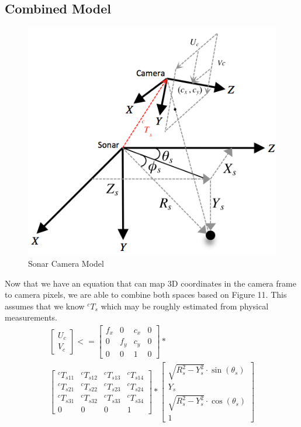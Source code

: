\documentclass[a4paper]{IEEEtran}
\begin{document}
\subsection{Combined Model}

\begin{figure}[h!]
  \centering
  \includegraphics[scale=0.4]{sonarcamframe}
  \captionsetup{justification=centering}
  \caption{Sonar Camera Model}
\end{figure}

Now that we have an equation that can map 3D coordinates in the camera frame to camera pixels, we are able to combine both spaces based on Figure 11. This assumes that we know $^{c}T_{s}$ which may be roughly estimated from physical measurements. 
\begingroup\makeatletter\def\f@size{7}\check@mathfonts
\begin{gather}
\left[\begin{array}{c}
U_{c}\\
V_{c}
\end{array}\right]<=\left[\begin{array}{cccc}
f_{x} & 0 & c_{x} & 0\\
0 & f_{y} & c_{y} & 0\\
0 & 0 & 1 & 0
\end{array}\right]* \nonumber\\
\left[\begin{array}{cccc}
^{c}T_{s11} & ^{c}T_{s12} & ^{c}T_{s13} & ^{c}T_{s14}\\
^{c}T_{s21} & ^{c}T_{s22} & ^{c}T_{s23} & ^{c}T_{s24}\\
^{c}T_{s31} & ^{c}T_{s32} & ^{c}T_{s33} & ^{c}T_{s34}\\
0 & 0 & 0 & 1
\end{array}\right]
*\left[\begin{array}{c}
\sqrt{R_{s}^{2}-Y_{s}^{2}}\cdot\sin\left(\theta_{s}\right)\\
Y_{s}\\
\sqrt{R_{s}^{2}-Y_{s}^{2}}\cdot\cos\left(\theta_{s}\right)\\
1
\end{array}\right]
\end{gather}
\endgroup
\end{document}
